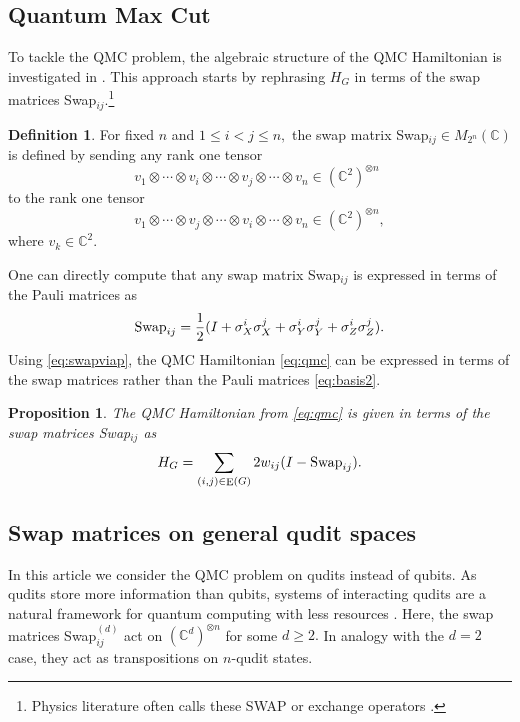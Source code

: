 \documentclass[12pt,dvipsnames,accepted=2016-08-18,a4paper,onecolumn]{quantumarticle}
\DeclareMathOperator{\EE}{E}
\numberwithin{equation}{section}
\newcommand{\CC}{\mathbb C}
\newtheorem{proposition}[theorem]{Proposition}
\theoremstyle{definition}
\newtheorem{definition}[theorem]{Definition}
\begin{document}
\subsection{Quantum Max Cut}
To tackle the QMC problem, the algebraic structure of the QMC Hamiltonian 
is investigated in \cite{BCEHK24,TRZ}. This approach starts by rephrasing $H_G$ in terms of the {swap matrices} Swap$_{ij}.$\footnote{Physics literature often calls these SWAP or exchange operators \cite{NC}.
} 

\begin{definition}
For fixed $n$ and  $1\leq i < j \leq n,$   the swap matrix \textnormal{Swap}$_{ij} \in M_{2^n}(\CC)$ is defined by sending any rank one tensor
    \[v_1\otimes \cdots \otimes v_i \otimes \cdots \otimes v_j \otimes \cdots \otimes v_n\in(\CC^2)^{\otimes n}\phantom{,}\] 
        to the rank one tensor
        \[
        v_1\otimes \cdots \otimes v_j \otimes \cdots \otimes v_i \otimes \cdots \otimes v_n\in(\CC^2)^{\otimes n},\] 
        where $v_k\in\CC^2$.
\end{definition}

One can directly compute that any swap matrix Swap$_{ij}$ is expressed in terms of the Pauli matrices as 
\begin{equation}\label{eq:swapviap}
        \textnormal{Swap}_{ij} = \frac{1}{2} (I + \sigma_X^i \sigma_X^j + \sigma_Y^i \sigma_Y^j + \sigma_Z^i \sigma_Z^j).
\end{equation}
Using \eqref{eq:swapviap}, the QMC Hamiltonian  \eqref{eq:qmc} can be expressed in terms of the swap matrices rather than the Pauli matrices \eqref{eq:basis2}.

\begin{proposition}
    The QMC Hamiltonian from \eqref{eq:qmc} is given in terms of the swap matrices \textnormal{Swap}$_{ij}$ as
    \begin{equation}\label{eq:HamSw}
        H_G = \sum_{(i,j) \in \EE(G)} 2 w_{ij} (I - \textnormal{Swap}_{ij}).
    \end{equation}
\end{proposition}

\subsection{Swap matrices on general qudit spaces}
In this article we consider the QMC problem
on qudits instead of qubits. As qudits store more information than qubits, systems of interacting qudits are a natural framework for quantum computing with less resources \cite{WHSK}.
Here, the swap matrices Swap$_{ij}^{(d)}$  act on $(\CC^d)^{\otimes n}$ for some $d\geq 2.$ In analogy with the $d=2$ case,  they act as transpositions on $n$-qudit states.
\end{document}
